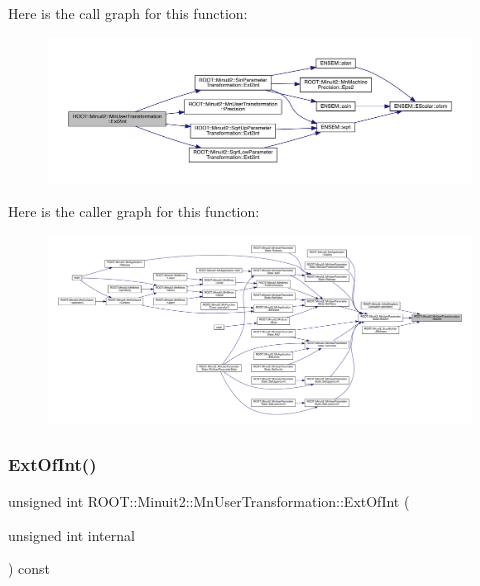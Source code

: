 Here is the call graph for this function\+:
\nopagebreak
\begin{figure}[H]
\begin{center}
\leavevmode
\includegraphics[width=350pt]{d9/d98/classROOT_1_1Minuit2_1_1MnUserTransformation_a0296bec1f14bc7ee514527b88aff0760_cgraph}
\end{center}
\end{figure}
Here is the caller graph for this function\+:
\nopagebreak
\begin{figure}[H]
\begin{center}
\leavevmode
\includegraphics[width=350pt]{d9/d98/classROOT_1_1Minuit2_1_1MnUserTransformation_a0296bec1f14bc7ee514527b88aff0760_icgraph}
\end{center}
\end{figure}
\mbox{\label{classROOT_1_1Minuit2_1_1MnUserTransformation_a114bf6d4e97b6f8bf5f3788e30e63002}} 
\subsubsection{\texorpdfstring{ExtOfInt()}{ExtOfInt()}\hspace{0.1cm}{\footnotesize\ttfamily [1/3]}}
{\footnotesize\ttfamily unsigned int R\+O\+O\+T\+::\+Minuit2\+::\+Mn\+User\+Transformation\+::\+Ext\+Of\+Int (\begin{DoxyParamCaption}\item[{unsigned int}]{internal }\end{DoxyParamCaption}) const\hspace{0.3cm}{\ttfamily [inline]}}

